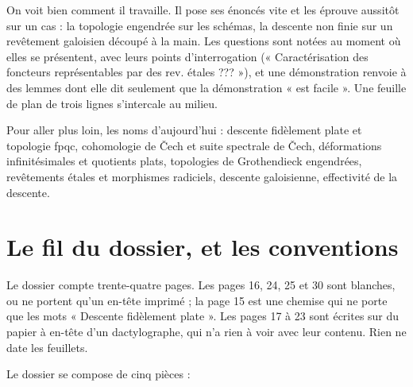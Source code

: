 \documentclass[11pt,a4paper]{article}
\begin{document}
\begin{resume}
On voit bien comment il travaille. Il pose ses énoncés vite et les
éprouve aussitôt sur un cas : la topologie engendrée sur les
schémas, la descente non finie sur un revêtement galoisien découpé à la main.
Les questions sont notées au moment où elles se présentent, avec leurs points
d'interrogation (« Caractérisation des foncteurs représentables par des
rev. étales ??? »), et une démonstration renvoie à des lemmes dont elle dit seulement que la démonstration « est facile ». Une feuille de plan
de trois lignes s'intercale au milieu.

Pour aller plus loin, les noms d'aujourd'hui : descente fidèlement plate et
topologie fpqc, cohomologie de Čech et suite spectrale de Čech, déformations
infinitésimales et quotients plats, topologies de Grothendieck engendrées,
revêtements étales et morphismes radiciels, descente galoisienne, effectivité
de la descente.

\end{resume}

\section*{Le fil du dossier, et les conventions}

Le dossier compte trente-quatre pages. Les pages 16, 24, 25 et 30 sont
blanches, ou ne portent qu'un en-tête imprimé ; la page 15 est une chemise qui
ne porte que les mots « Descente fidèlement plate ». Les pages 17 à 23 sont
écrites sur du papier à en-tête d'un dactylographe, qui n'a rien à voir avec
leur contenu. Rien ne date les feuillets.

Le dossier se compose de cinq pièces :
\end{document}
